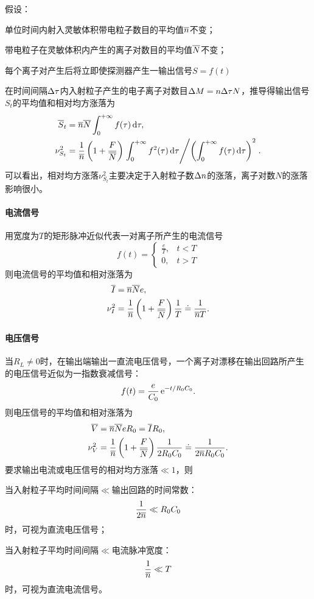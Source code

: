 
假设：
\begin{compactenum}
	\item 单位时间内射入灵敏体积带电粒子数目的平均值$\overline{n}$不变；
	\item 带电粒子在灵敏体积内产生的离子对数目的平均值$\overline{N}$不变；
	\item 每个离子对产生后将立即使探测器产生一输出信号$S=f(t)$
\end{compactenum}
在时间间隔$\Delta\tau$内入射粒子产生的电子离子对数目$\Delta M=n\Delta\tau N$，推导得输出信号$S_t$的平均值和相对均方涨落为
\begin{align*}
	\overline{S}_t&=\overline{n}\overline{N}\int_0^{+\infty} f(\tau)\mathop{}\!\mathrm{d}\tau,\\
	\nu_{S_t}^2&=\frac1{\overline{n}}\left(1+\frac F{\overline{N}}\right)\left.{\int_0^{+\infty} f^2(\tau)\mathop{}\!\mathrm{d}\tau}\middle/{\left(\int_0^{+\infty} f(\tau)\mathop{}\!\mathrm{d}\tau\right)^2}\right..
\end{align*}
可以看出，相对均方涨落$\nu_{S_t}^2$主要决定于入射粒子数$\Delta n$的涨落，离子对数$N$的涨落影响很小。
\paragraph{电流信号}用宽度为$T$的矩形脉冲近似代表一对离子所产生的电流信号
\[
	f(t)=\begin{cases}
		\frac eT,&t<T\\
		0,&t>T
	\end{cases}
\]
则电流信号的平均值和相对涨落为
\begin{align}
	\overline{I}&=\overline{n}\overline{N}e,\\
	\nu_I^2&=\frac1{\overline{n}}\left(1+\frac F{\overline{N}}\right)\frac1T\doteq\frac1{\overline{n}T}.
\end{align}
\paragraph{电压信号}
当$R_L\neq 0$时，在输出端输出一直流电压信号，一个离子对漂移在输出回路所产生的电压信号近似为一指数衰减信号：
\[
	f(t)=\frac e{C_0}\mathop{}\!\mathrm{e}^{-t/R_0C_0}.
\]
则电压信号的平均值和相对涨落为
\begin{align}
	\overline{V}&=\overline{n}\overline{N}eR_0=\overline{I}R_0,\\
	\nu_V^2&=\frac1{\overline{n}}\left(1+\frac F{\overline{N}}\right)\frac1{2R_0C_0}\doteq\frac1{2\overline{n}R_0C_0}.
\end{align}
要求输出电流或电压信号的相对均方涨落$\ll 1$，则
\begin{compactenum}
	\item 
	当入射粒子平均时间间隔$\ll$输出回路的时间常数：
	\[
		\frac1{2\overline{n}}\ll R_0C_0
	\]
	时，可视为直流电压信号；
	\item 
	当入射粒子平均时间间隔$\ll$电流脉冲宽度：
	\[
		\frac1{\overline{n}}\ll T
	\]
	时，可视为直流电流信号。
\end{compactenum}
